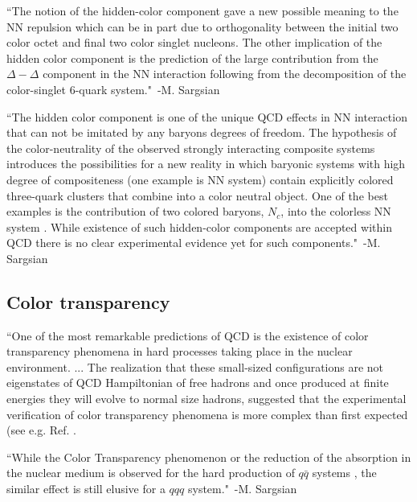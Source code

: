 ``The notion of the hidden-color component gave a new possible meaning to the NN repulsion which can be in part due to orthogonality between the initial two color octet and final two color singlet nucleons. The other implication of the hidden color component is the prediction of the large contribution from the $\Delta-\Delta$ component in the NN interaction following from the decomposition of the color-singlet 6-quark system."~-M. Sargsian~\cite{Sargsian:2014bwa}

``The hidden color component is one of the unique QCD effects in NN interaction that can not be imitated by any baryons degrees of freedom. The hypothesis of the color-neutrality of the observed strongly interacting composite systems introduces the possibilities for a new reality in which baryonic systems with high degree of compositeness (one example is NN system) contain explicitly colored three-quark clusters that combine into a color neutral object. One of the best examples is the contribution of two colored baryons, $N_c$, into the colorless NN system \cite{Harvey:1980rva,Brodsky:1985gu,Ji:1985ky}. While existence of such hidden-color components are accepted within QCD there is no clear experimental evidence yet for such components."~-M. Sargsian~\cite{Sargsian:2014bwa}

\subsection{Color transparency}
``One of the most remarkable predictions of QCD is the existence of color transparency phenomena in hard processes taking place in the nuclear environment. ... The realization that these small-sized configurations are not eigenstates of QCD Hampiltonian of free hadrons and once produced at finite energies they will evolve to normal size hadrons, suggested that the experimental verification of color transparency phenomena is more complex than first expected (see e.g. Ref. \cite{Farrar:1988me,Kopeliovich:2007mm}.

``While the Color Transparency phenomenon or the reduction of the absorption in the nuclear medium is observed for the hard production of $q\bar{q}$ systems \cite{Frankfurt:1993it,ElFassi:2012nr,Clasie:2007aa}, the similar effect is still elusive for a $qqq$ system."~-M. Sargsian~\cite{Sargsian:2014bwa}

